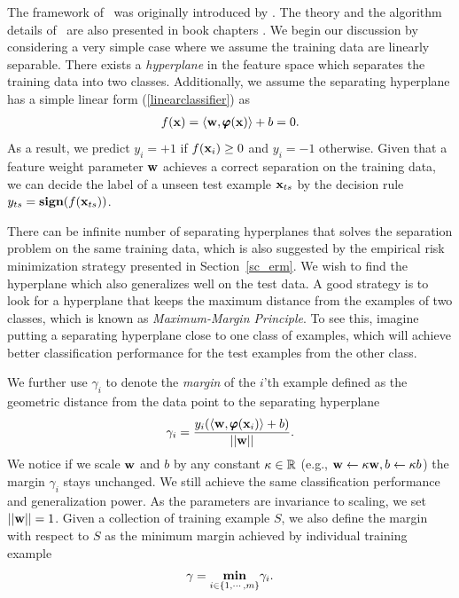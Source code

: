 {The framework of \svm\ was originally introduced by \citep{Cortes95support}.
The theory and the algorithm details of \svm\ are also presented in book chapters \citep{Scholkopf02learning,taylor04,Bishop07}.
We begin our discussion by considering a very simple case where we assume the training data are linearly separable.
There exists a \textit{hyperplane} in the feature space which separates the training data into two classes.
Additionally, we assume the {separating hyperplane} has a simple linear form (\ref{linearclassifier}) as
\begin{align*}
	f(\mathbf {x})=\langle \mathbf {w}, \pmb \varphi(\mathbf {x}) \rangle + b = 0.
\end{align*}
As a result, we predict $y_i=+1$ if $f(\mathbf {x}_i)\ge0$ and $y_i=-1$ otherwise.
Given that a feature weight parameter $\mathbf {w}$ achieves a correct separation on the training data, we can decide the label of a unseen test example $\mathbf {x}_{ts}$ by the decision rule $y_{ts}=\textbf{sign}(f(\mathbf {x}_{ts}))$.

There can be infinite number of separating hyperplanes that solves the separation problem on the same training data, which is also suggested by the empirical risk minimization strategy presented in Section~\ref{sc_erm}. 
We wish to find the hyperplane which also generalizes well on the test data.
A good strategy is to look for a hyperplane that keeps the maximum distance from the examples of two classes, which is known as \textit{Maximum-Margin Principle}.
To see this, imagine putting a separating hyperplane close to one class of examples, which will achieve better classification performance for the test examples from the other class.

We further use $\gamma_i$ to denote the \textit{margin} of the $i$'th example defined as the geometric distance from the data point to the separating hyperplane
\begin{align*}
	\gamma_i = \frac{y_i(\langle \mathbf {w}, \pmb \varphi(\mathbf {x}_i) \rangle+b)}{\left|\left| \mathbf {w} \right|\right|}.
\end{align*}
We notice if we scale $\mathbf {w}$ and $b$ by any constant $\kappa\in\mathbb{R}$ (e.g., $\mathbf {w}\leftarrow\kappa\mathbf {w}, b\leftarrow\kappa b$) the margin $\gamma_i$ stays unchanged. 
We still achieve the same classification performance and generalization power.
As the parameters are invariance to scaling, we set $\left|\left| \mathbf {w} \right|\right|=1$.
Given a collection of training example $S$, we also define the margin with respect to $S$ as the minimum margin achieved by individual training example
\begin{align*}
	\gamma = \underset{i\in\{1,\cdots,m\}}{\textbf{min}}\gamma_i.
\end{align*}

}

